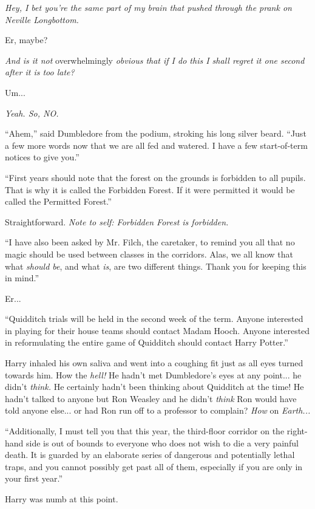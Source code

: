 \emph{Hey, I bet you're the same part of my brain that pushed through
the prank on Neville Longbottom.}

Er, maybe?

\emph{And is it not} overwhelmingly \emph{obvious that if I do this I
shall regret it one second after it is too late?}

Um...

\emph{Yeah. So, NO.}

``Ahem,'' said Dumbledore from the podium, stroking his long silver
beard. ``Just a few more words now that we are all fed and watered. I
have a few start-of-term notices to give you.''

``First years should note that the forest on the grounds is forbidden to
all pupils. That is why it is called the Forbidden Forest. If it were
permitted it would be called the Permitted Forest.''

Straightforward. \emph{Note to self: Forbidden Forest is forbidden.}

``I have also been asked by Mr. Filch, the caretaker, to remind you all
that no magic should be used between classes in the corridors. Alas, we
all know that what \emph{should be}, and what \emph{is}, are two
different things. Thank you for keeping this in mind.''

Er...

``Quidditch trials will be held in the second week of the term. Anyone
interested in playing for their house teams should contact Madam Hooch.
Anyone interested in reformulating the entire game of Quidditch should
contact Harry Potter.''

Harry inhaled his own saliva and went into a coughing fit just as all
eyes turned towards him. How the \emph{hell!} He hadn't met Dumbledore's
eyes at any point... he didn't \emph{think.} He certainly hadn't
been thinking about Quidditch at the time! He hadn't talked to anyone
but Ron Weasley and he didn't \emph{think} Ron would have told anyone
else... or had Ron run off to a professor to complain? \emph{How}
on \emph{Earth...}

``Additionally, I must tell you that this year, the third-floor corridor
on the right-hand side is out of bounds to everyone who does not wish to
die a very painful death. It is guarded by an elaborate series of
dangerous and potentially lethal traps, and you cannot possibly get past
all of them, especially if you are only in your first year.''

Harry was numb at this point.

